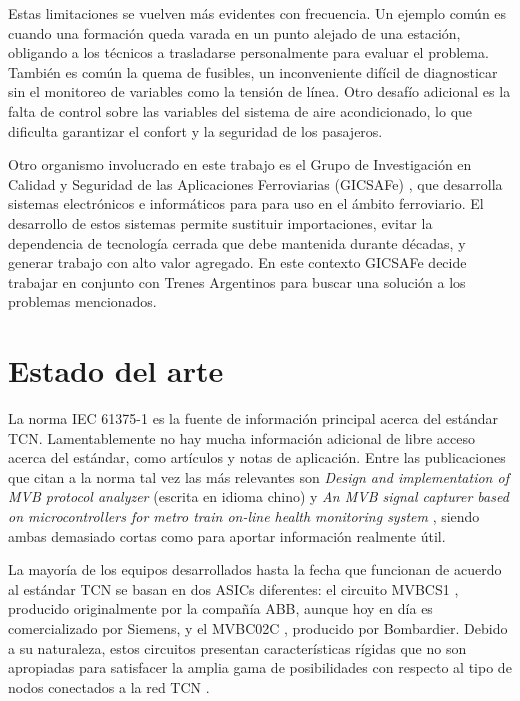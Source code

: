 Estas limitaciones se vuelven más evidentes con frecuencia. Un ejemplo común es cuando una formación queda varada en un punto alejado de una estación, obligando a los técnicos a trasladarse personalmente para evaluar el problema.
También es común la quema de fusibles, un inconveniente difícil de diagnosticar sin el monitoreo de variables como la tensión de línea.
Otro desafío adicional es la falta de control sobre las variables del sistema de aire acondicionado, lo que dificulta garantizar el confort y la seguridad de los pasajeros.

Otro organismo involucrado en este trabajo es el Grupo de Investigación en Calidad y Seguridad de las Aplicaciones Ferroviarias (GICSAFe) \cite{web:gicsafe}, que desarrolla sistemas electrónicos e informáticos para para uso en el ámbito ferroviario. El desarrollo de estos sistemas permite sustituir importaciones, evitar la dependencia de tecnología cerrada que debe mantenida durante décadas, y generar trabajo con alto valor agregado. En este contexto GICSAFe decide trabajar en conjunto con Trenes Argentinos para buscar una solución a los problemas mencionados.

\section{Estado del arte}

\label{estadodelarte}

La norma IEC 61375-1 es la fuente de información principal acerca del estándar TCN. Lamentablemente no hay mucha información adicional de libre acceso acerca del estándar, como artículos y notas de aplicación. Entre las publicaciones que citan a la norma tal vez las más relevantes son \textit{Design and implementation of MVB protocol analyzer} \cite{mvb-pub-1} (escrita en idioma chino) y \textit{An MVB signal capturer based on microcontrollers for metro train on-line health monitoring system} \cite{mvb-pub-2}, siendo ambas demasiado cortas como para aportar información realmente útil.

La mayoría de los equipos desarrollados hasta la fecha que funcionan de acuerdo al estándar TCN se basan en dos ASICs diferentes: el circuito MVBCS1 \cite{mvbcs1}, producido originalmente por la compañía ABB, aunque hoy en día es comercializado por Siemens, y el MVBC02C \cite{mvbc02c}, producido por Bombardier. Debido a su naturaleza, estos circuitos presentan características rígidas que no son apropiadas para satisfacer la amplia gama de posibilidades con respecto al tipo de nodos conectados a la red TCN \cite{mvb-pub-3}.

